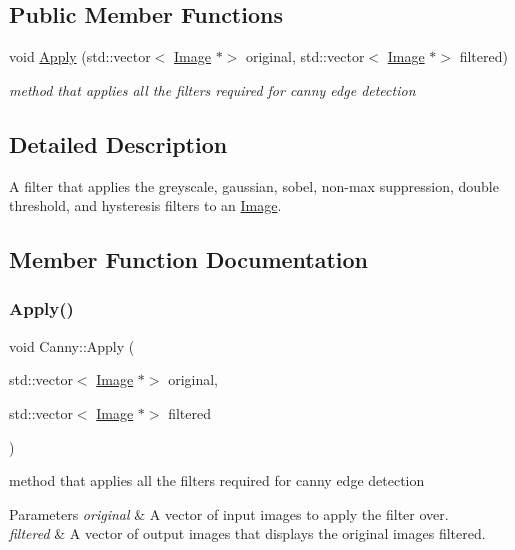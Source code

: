 \subsection*{Public Member Functions}
\begin{DoxyCompactItemize}
\item 
void \hyperlink{classCanny_aefadd0d0166f26f76d6bf2cf59dae3aa}{Apply} (std\+::vector$<$ \hyperlink{classImage}{Image} $\ast$$>$ original, std\+::vector$<$ \hyperlink{classImage}{Image} $\ast$$>$ filtered)
\begin{DoxyCompactList}\small\item\em method that applies all the filters required for canny edge detection \end{DoxyCompactList}\end{DoxyCompactItemize}


\subsection{Detailed Description}
A filter that applies the greyscale, gaussian, sobel, non-\/max suppression, double threshold, and hysteresis filters to an \hyperlink{classImage}{Image}. 

\subsection{Member Function Documentation}
\mbox{\label{classCanny_aefadd0d0166f26f76d6bf2cf59dae3aa}} 
\subsubsection{\texorpdfstring{Apply()}{Apply()}}
{\footnotesize\ttfamily void Canny\+::\+Apply (\begin{DoxyParamCaption}\item[{std\+::vector$<$ \hyperlink{classImage}{Image} $\ast$$>$}]{original,  }\item[{std\+::vector$<$ \hyperlink{classImage}{Image} $\ast$$>$}]{filtered }\end{DoxyParamCaption})\hspace{0.3cm}{\ttfamily [virtual]}}



method that applies all the filters required for canny edge detection 


\begin{DoxyParams}{Parameters}
{\em original} & A vector of input images to apply the filter over. \\
\hline
{\em filtered} & A vector of output images that displays the original images filtered. \\
\hline
\end{DoxyParams}


